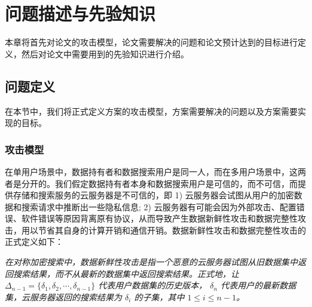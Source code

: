 \chapter{问题描述与先验知识}
\label{cha:problem}
本章将首先对论文的攻击模型，论文需要解决的问题和论文预计达到的目标进行定义，然后对论文中需要用到的先验知识进行介绍。

\section{问题定义}
在本节中，我们将正式定义方案的攻击模型，方案需要解决的问题以及方案需要实现的目标。

\subsection{攻击模型}
在单用户场景中，数据持有者和数据搜索用户是同一人，而在多用户场景中，这两者是分开的。我们假定数据持有者本身和数据搜索用户是可信的，而不可信，而提供存储和搜索服务的云服务器是不可信的，即 1) 云服务器会试图从用户的加密数据和搜索请求中推断出一些隐私信息; 2) 云服务器有可能会因为外部攻击、配置错误、软件错误等原因背离原有协议，从而导致产生数据新鲜性攻击和数据完整性攻击，用以节省其自身的计算开销和通信开销。数据新鲜性攻击和数据完整性攻击的正式定义如下：

\begin{definition}\label{def:freshness}
    {\itshape
			在对称加密搜索中，数据新鲜性攻击是指一个恶意的云服务器试图从旧数据集中返回搜索结果，而不从最新的数据集中返回搜索结果。正式地，让$\Delta_{n-1} = \{\delta_1,\delta_2,\cdots,\delta_{n-1}\}$ 代表用户数据集的历史版本， $\delta_n$ 代表用户的最新数据集，云服务器返回的搜索结果为 $\delta_i$ 的子集，其中 $1 \le i \le n-1$。
    }
\end{definition}

